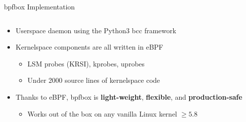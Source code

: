 \documentclass[12pt, dvipsnames, aspectratio=169]{beamer}
\begin{document}


\begin{frame}[c]{bpfbox Implementation}
\begin{columns}
    \begin{column}{0.66\textwidth}
        \begin{itemize}
            \item Userspace daemon using the Python3 bcc framework
            \vspace{2em}
            \item Kernelspace components are all written in eBPF
            \begin{itemize}
                \item LSM probes (KRSI), kprobes, uprobes
                \item Under 2000 source lines of kernelspace code
            \end{itemize}
            \vspace{2em}
            \item Thanks to eBPF, bpfbox is \textbf{light-weight}, \textbf{flexible}, and \textbf{production-safe}
            \begin{itemize}
                \item Works out of the box on any vanilla Linux kernel $\ge 5.8$
            \end{itemize}
        \end{itemize}
    \end{column}
    \begin{column}{0.33\textwidth}
        \begin{center}
            \color{black}

\end{center}
\end{column}
\end{columns}
\end{frame}
\end{document}
